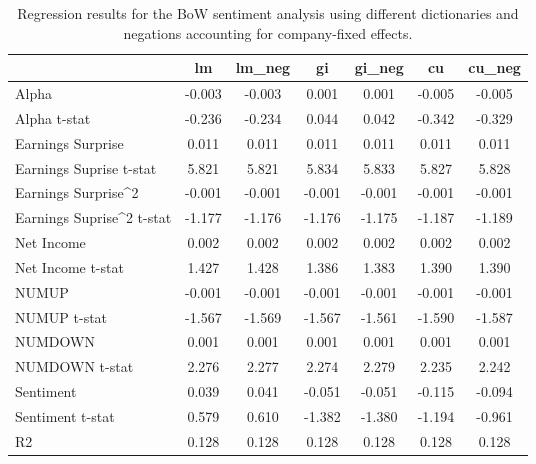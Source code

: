\begin{table}
\caption{Regression results for the BoW sentiment analysis using different dictionaries and negations accounting for company-fixed effects.}
\label{tab:bow_regressions_company_fixed}
\begin{tabular}{lcccccc}
\toprule
 & lm & lm_neg & gi & gi_neg & cu & cu_neg \\
\midrule
Alpha & -0.003 & -0.003 & 0.001 & 0.001 & -0.005 & -0.005 \\
Alpha t-stat & -0.236 & -0.234 & 0.044 & 0.042 & -0.342 & -0.329 \\
Earnings Surprise & 0.011 & 0.011 & 0.011 & 0.011 & 0.011 & 0.011 \\
Earnings Suprise t-stat & 5.821 & 5.821 & 5.834 & 5.833 & 5.827 & 5.828 \\
Earnings Surprise^2 & -0.001 & -0.001 & -0.001 & -0.001 & -0.001 & -0.001 \\
Earnings Suprise^2 t-stat & -1.177 & -1.176 & -1.176 & -1.175 & -1.187 & -1.189 \\
Net Income & 0.002 & 0.002 & 0.002 & 0.002 & 0.002 & 0.002 \\
Net Income t-stat & 1.427 & 1.428 & 1.386 & 1.383 & 1.390 & 1.390 \\
NUMUP & -0.001 & -0.001 & -0.001 & -0.001 & -0.001 & -0.001 \\
NUMUP t-stat & -1.567 & -1.569 & -1.567 & -1.561 & -1.590 & -1.587 \\
NUMDOWN & 0.001 & 0.001 & 0.001 & 0.001 & 0.001 & 0.001 \\
NUMDOWN t-stat & 2.276 & 2.277 & 2.274 & 2.279 & 2.235 & 2.242 \\
Sentiment & 0.039 & 0.041 & -0.051 & -0.051 & -0.115 & -0.094 \\
Sentiment t-stat & 0.579 & 0.610 & -1.382 & -1.380 & -1.194 & -0.961 \\
R2 & 0.128 & 0.128 & 0.128 & 0.128 & 0.128 & 0.128 \\
\bottomrule
\end{tabular}
\end{table}
